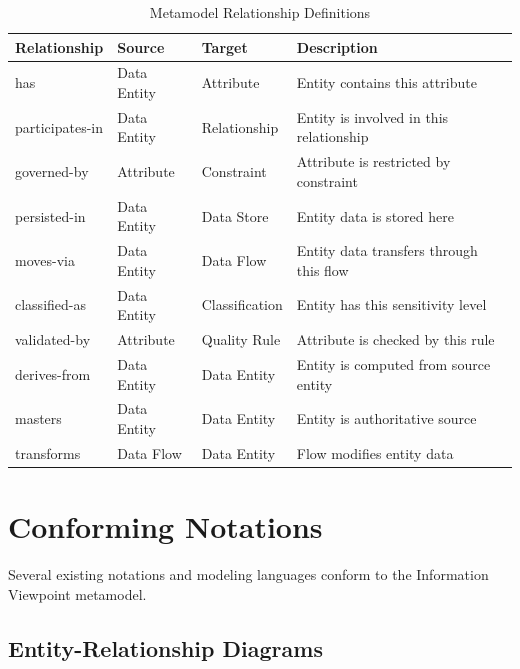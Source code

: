 \documentclass[11pt,letterpaper]{article}
\begin{document}
\begin{table}[H]
\centering
\caption{Metamodel Relationship Definitions}
\small
\begin{tabular}{@{}L{2.3cm}L{2.3cm}L{2.3cm}L{\dimexpr\linewidth-6.9cm-6\tabcolsep\relax}@{}}
\toprule
\textbf{Relationship} & \textbf{Source} & \textbf{Target} & \textbf{Description} \\
\midrule
has & Data Entity & Attribute & Entity contains this attribute \\
\addlinespace
participates-in & Data Entity & Relationship & Entity is involved in this relationship \\
\addlinespace
governed-by & Attribute & Constraint & Attribute is restricted by constraint \\
\addlinespace
persisted-in & Data Entity & Data Store & Entity data is stored here \\
\addlinespace
moves-via & Data Entity & Data Flow & Entity data transfers through this flow \\
\addlinespace
classified-as & Data Entity & Classification & Entity has this sensitivity level \\
\addlinespace
validated-by & Attribute & Quality Rule & Attribute is checked by this rule \\
\addlinespace
derives-from & Data Entity & Data Entity & Entity is computed from source entity \\
\addlinespace
masters & Data Entity & Data Entity & Entity is authoritative source \\
\addlinespace
transforms & Data Flow & Data Entity & Flow modifies entity data \\
\bottomrule
\end{tabular}
\end{table}

\section{Conforming Notations}

Several existing notations and modeling languages conform to the Information Viewpoint metamodel.

\subsection{Entity-Relationship Diagrams}
\end{document}
